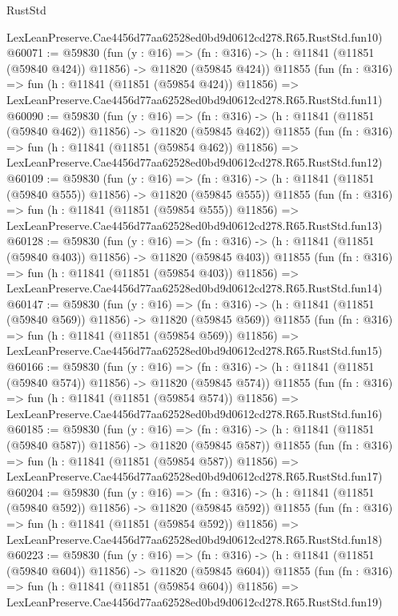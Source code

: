 \begin{lexlean}{RustStd}
\begin{coremodule}
    LexLeanPreserve.Cae4456d77aa62528ed0bd9d0612cd278.R65.RustStd.fun10)
@60071 := @59830
    (fun (y : @16) =>
    (fn : @316) -> (h : @11841 (@11851 (@59840 @424)) @11856) -> @11820 (@59845 @424))
    @11855
    (fun (fn : @316) =>
    fun (h : @11841 (@11851 (@59854 @424)) @11856) =>
    LexLeanPreserve.Cae4456d77aa62528ed0bd9d0612cd278.R65.RustStd.fun11)
@60090 := @59830
    (fun (y : @16) =>
    (fn : @316) -> (h : @11841 (@11851 (@59840 @462)) @11856) -> @11820 (@59845 @462))
    @11855
    (fun (fn : @316) =>
    fun (h : @11841 (@11851 (@59854 @462)) @11856) =>
    LexLeanPreserve.Cae4456d77aa62528ed0bd9d0612cd278.R65.RustStd.fun12)
@60109 := @59830
    (fun (y : @16) =>
    (fn : @316) -> (h : @11841 (@11851 (@59840 @555)) @11856) -> @11820 (@59845 @555))
    @11855
    (fun (fn : @316) =>
    fun (h : @11841 (@11851 (@59854 @555)) @11856) =>
    LexLeanPreserve.Cae4456d77aa62528ed0bd9d0612cd278.R65.RustStd.fun13)
@60128 := @59830
    (fun (y : @16) =>
    (fn : @316) -> (h : @11841 (@11851 (@59840 @403)) @11856) -> @11820 (@59845 @403))
    @11855
    (fun (fn : @316) =>
    fun (h : @11841 (@11851 (@59854 @403)) @11856) =>
    LexLeanPreserve.Cae4456d77aa62528ed0bd9d0612cd278.R65.RustStd.fun14)
@60147 := @59830
    (fun (y : @16) =>
    (fn : @316) -> (h : @11841 (@11851 (@59840 @569)) @11856) -> @11820 (@59845 @569))
    @11855
    (fun (fn : @316) =>
    fun (h : @11841 (@11851 (@59854 @569)) @11856) =>
    LexLeanPreserve.Cae4456d77aa62528ed0bd9d0612cd278.R65.RustStd.fun15)
@60166 := @59830
    (fun (y : @16) =>
    (fn : @316) -> (h : @11841 (@11851 (@59840 @574)) @11856) -> @11820 (@59845 @574))
    @11855
    (fun (fn : @316) =>
    fun (h : @11841 (@11851 (@59854 @574)) @11856) =>
    LexLeanPreserve.Cae4456d77aa62528ed0bd9d0612cd278.R65.RustStd.fun16)
@60185 := @59830
    (fun (y : @16) =>
    (fn : @316) -> (h : @11841 (@11851 (@59840 @587)) @11856) -> @11820 (@59845 @587))
    @11855
    (fun (fn : @316) =>
    fun (h : @11841 (@11851 (@59854 @587)) @11856) =>
    LexLeanPreserve.Cae4456d77aa62528ed0bd9d0612cd278.R65.RustStd.fun17)
@60204 := @59830
    (fun (y : @16) =>
    (fn : @316) -> (h : @11841 (@11851 (@59840 @592)) @11856) -> @11820 (@59845 @592))
    @11855
    (fun (fn : @316) =>
    fun (h : @11841 (@11851 (@59854 @592)) @11856) =>
    LexLeanPreserve.Cae4456d77aa62528ed0bd9d0612cd278.R65.RustStd.fun18)
@60223 := @59830
    (fun (y : @16) =>
    (fn : @316) -> (h : @11841 (@11851 (@59840 @604)) @11856) -> @11820 (@59845 @604))
    @11855
    (fun (fn : @316) =>
    fun (h : @11841 (@11851 (@59854 @604)) @11856) =>
    LexLeanPreserve.Cae4456d77aa62528ed0bd9d0612cd278.R65.RustStd.fun19)

\end{coremodule}
\end{lexlean}

